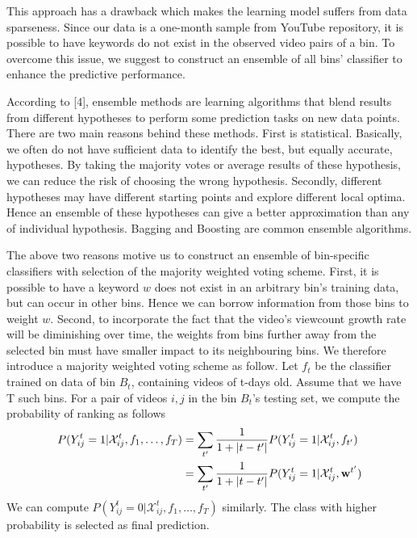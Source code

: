	This approach has a drawback which makes the learning model suffers from data sparseness. Since our data is a one-month sample from YouTube repository, it is possible to have keywords do not exist in the observed video pairs of a bin. To overcome this issue, we suggest to construct an ensemble of all bins' classifier to enhance the predictive performance. 

	According to [4], ensemble methods are learning algorithms that blend results from different hypotheses to perform some prediction tasks on new data points. There are two main reasons behind these methods. First is statistical. Basically, we often do not have sufficient data to identify the best, but equally accurate, hypotheses. By taking the majority votes or average results of these hypothesis, we can reduce the risk of choosing the wrong hypothesis. Secondly, different hypotheses may have different starting points and explore different local optima. Hence an ensemble of these hypotheses can give a better approximation than any of individual hypothesis.
	Bagging and Boosting are common ensemble algorithms. 

	The above two reasons motive us to construct an ensemble of bin-specific classifiers with selection of the majority weighted voting scheme. First, it is possible to have a keyword $w$ does not exist in an arbitrary bin's training data, but can occur in other bins. Hence we can borrow information from those bins to weight $w$. Second, to incorporate the fact that the video's viewcount growth rate will be diminishing over time, the weights from bins further away from the selected bin must have smaller impact to its neighbouring bins. We therefore introduce a majority weighted voting scheme as follow. Let $f_t$ be the classifier trained on data of bin $B_t$, containing videos of t-days old. Assume that we have T such bins. For a pair of videos $i, j$ in the bin $B_t$'s testing set, we compute the probability of ranking as follows
		\begin{align}
			P(Y_{ij}^t = 1 | \mathcal{X}_{ij}^t, f_1, \ldots, f_T) &= \sum_{t'} \frac{1}{1+|t - t'|} P(Y_{ij}^t = 1 | \mathcal{X}_{ij}^t, f_{t'}) \\ \notag 
			&= \sum_{t'} \frac{1}{1+|t - t'|} P(Y_{ij}^t = 1 | \mathcal{X}_{ij}^t, \textbf{w}^{t'})
		\end{align}
		We can compute $P(Y_{ij}^t = 0 | \mathcal{X}_{ij}^t, f_1, \ldots, f_T)$ similarly. The class with higher probability is selected as final prediction. 
